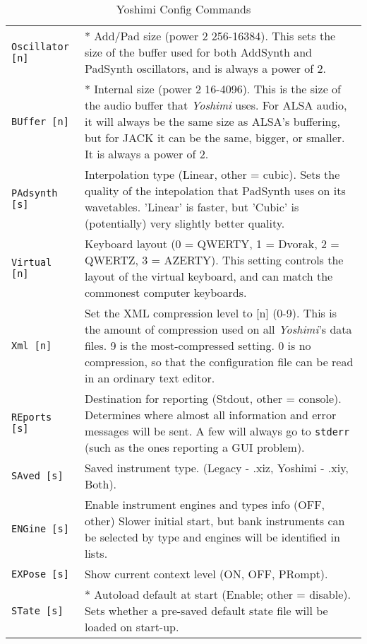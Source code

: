 \begin{center}
\begin{longtable}{p{4cm} p{10cm}}
\caption[Yoshimi Config Commands]{Yoshimi Config Commands} \\

\texttt{Oscillator [n]} &
   * Add/Pad size (power 2 256-16384).
   This sets the size of the buffer used for both AddSynth and PadSynth
   oscillators, and is always a power of 2.  \\
\texttt{BUffer [n]} &
   * Internal size (power 2 16-4096).
   This is the size of the audio buffer that \textsl{Yoshimi} uses.  For ALSA
   audio, it will always be the same size as ALSA's buffering, but for JACK it
   can be the same, bigger, or smaller. It is always a power of 2. \\
\texttt{PAdsynth [s]} &
   Interpolation type (Linear, other = cubic).
   Sets the quality of the intepolation that PadSynth uses on its wavetables.
   'Linear' is faster, but 'Cubic' is (potentially) very slightly better
   quality. \\
\texttt{Virtual [n]} &
   Keyboard layout (0 = QWERTY, 1 = Dvorak, 2 = QWERTZ, 3 = AZERTY).
   This setting controls the layout of the virtual keyboard, and can match the
   commonest computer keyboards. \\
\texttt{Xml [n]} &
   Set the XML compression level to [n] (0-9).
   This is the amount of compression used on all
   \textsl{Yoshimi}'s data files. 9 is the most-compressed setting.
   0 is no compression, so that the configuration file
   can be read in an ordinary text editor. \\
\texttt{REports [s]} &
   Destination for reporting (Stdout, other = console).
   Determines where almost all information and error messages will be sent. A
   few will always go to \texttt{stderr} (such as the ones reporting a GUI
   problem). \\
\texttt{SAved [s]} &
   Saved instrument type. (Legacy - .xiz, Yoshimi - .xiy, Both).\\
\texttt{ENGine [s]} &
   Enable instrument engines and types info (OFF, {other})
   Slower initial start, but bank instruments can be selected by type and
   engines will be identified in lists.\\
\texttt{EXPose [s]} &
   Show current context level (ON, OFF, PRompt).\\
\texttt{STate [s]} &
   * Autoload default at start (Enable; other = disable).
   Sets whether a pre-saved default state file will be loaded on start-up. \\

\end{longtable}
\end{center}
